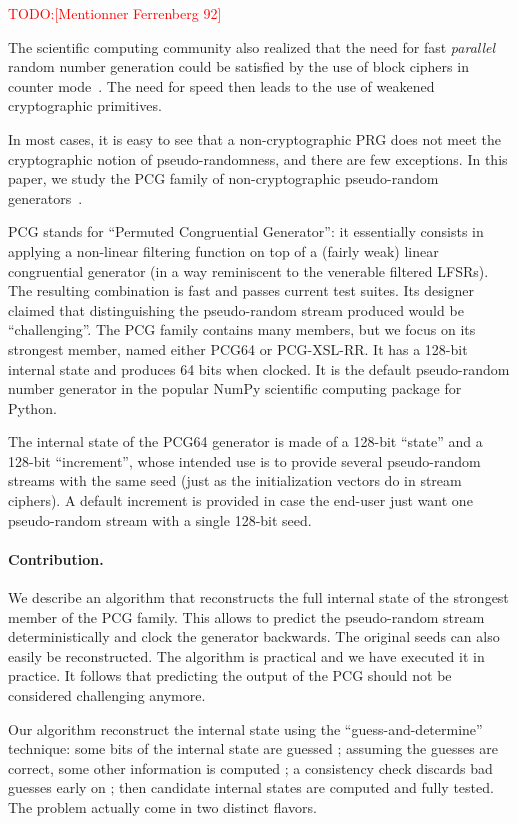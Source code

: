\documentclass[preprint]{iacrtrans}
\newcommand{\todo}[1]{\textcolor{red}{TODO:[#1]}}
\begin{document}
\todo{Mentionner Ferrenberg 92}

The scientific computing community also realized that the need for fast
\emph{parallel} random number generation could be satisfied by the use of block
ciphers in counter mode~\cite{Salmon11}. The need for speed then leads to the
use of weakened cryptographic primitives.

In most cases, it is easy to see that a non-cryptographic PRG does not meet the
cryptographic notion of pseudo-randomness, and there are few exceptions. In this
paper, we study the \textsf{PCG} family of non-cryptographic pseudo-random
generators~\cite{melissapaper,melissaweb}.

\textsf{PCG} stands for ``Permuted Congruential Generator'': it essentially
consists in applying a non-linear filtering function on top of a (fairly weak)
linear congruential generator (in a way reminiscent to the venerable filtered
LFSRs). The resulting combination is fast and passes current test suites. Its
designer claimed that distinguishing the pseudo-random stream produced would be
``challenging''. The \textsf{PCG} family contains many members, but we focus on
its strongest member, named either \textsf{PCG64} or \textsf{PCG-XSL-RR}. It has
a 128-bit internal state and produces 64 bits when clocked. It is the default
pseudo-random number generator in the popular \textsf{NumPy} scientific
computing package for \textsf{Python}.

The internal state of the \textsf{PCG64} generator is made of a 128-bit
``state'' and a 128-bit ``increment'', whose intended use is to provide several
pseudo-random streams with the same seed (just as the initialization vectors do
in stream ciphers). A default increment is provided in case the end-user just
want one pseudo-random stream with a single 128-bit seed.

\paragraph{Contribution.} We describe an algorithm that reconstructs the full
internal state of the strongest member of the \textsf{PCG} family. This allows
to predict the pseudo-random stream deterministically and clock the generator
backwards. The original seeds can also easily be reconstructed. The algorithm is
practical and we have executed it in practice. It follows that predicting the
output of the \textsf{PCG} should not be considered challenging anymore.

Our algorithm reconstruct the internal state using the ``guess-and-determine''
technique: some bits of the internal state are guessed ; assuming the guesses
are correct, some other information is computed ; a consistency check discards
bad guesses early on ; then candidate internal states are computed and fully
tested. The problem actually come in two distinct flavors.
\end{document}
